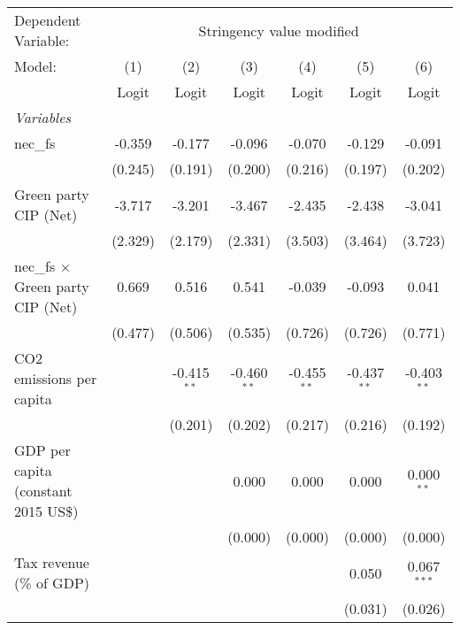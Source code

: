 
\begingroup
\centering
\begin{tabular}{lcccccc}
   \toprule
   Dependent Variable: & \multicolumn{6}{c}{Stringency value modified}\\
   Model:                                   & (1)     & (2)           & (3)           & (4)           & (5)           & (6)\\  
                                            &  Logit  & Logit         & Logit         & Logit         & Logit         & Logit\\  
   \midrule
   \emph{Variables}\\
   nec\_fs                                  & -0.359  & -0.177        & -0.096        & -0.070        & -0.129        & -0.091\\   
                                            & (0.245) & (0.191)       & (0.200)       & (0.216)       & (0.197)       & (0.202)\\   
   Green party CIP (Net)                    & -3.717  & -3.201        & -3.467        & -2.435        & -2.438        & -3.041\\   
                                            & (2.329) & (2.179)       & (2.331)       & (3.503)       & (3.464)       & (3.723)\\   
   nec\_fs $\times$ Green party CIP (Net)   & 0.669   & 0.516         & 0.541         & -0.039        & -0.093        & 0.041\\   
                                            & (0.477) & (0.506)       & (0.535)       & (0.726)       & (0.726)       & (0.771)\\   
   CO2 emissions per capita                 &         & -0.415$^{**}$ & -0.460$^{**}$ & -0.455$^{**}$ & -0.437$^{**}$ & -0.403$^{**}$\\   
                                            &         & (0.201)       & (0.202)       & (0.217)       & (0.216)       & (0.192)\\   
   GDP per capita (constant 2015 US\$)      &         &               & 0.000         & 0.000         & 0.000         & 0.000$^{**}$\\   
                                            &         &               & (0.000)       & (0.000)       & (0.000)       & (0.000)\\   
   Tax revenue (\% of GDP)                  &         &               &               &               & 0.050         & 0.067$^{***}$\\   
                                            &         &               &               &               & (0.031)       & (0.026)\\   

\end{tabular}
